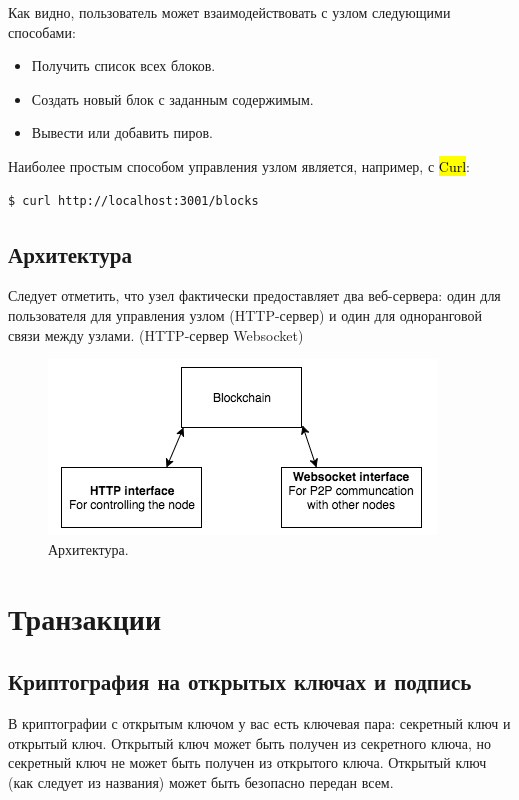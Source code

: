 \documentclass{article}
\begin{document}
Как видно, пользователь может взаимодействовать с узлом следующими способами:

\begin{itemize}
	\item Получить список всех блоков.
	\item Создать новый блок с заданным содержимым.
	\item Вывести или добавить пиров. 
\end{itemize}

Наиболее простым способом управления узлом является, например, с \hl{Curl}:

\begin{lstlisting}[caption={Отправка HTTP запроса, для получения списка блоков.}]
$ curl http://localhost:3001/blocks
\end{lstlisting}


\subsection{Архитектура}

Следует отметить, что узел фактически предоставляет два веб-сервера: один для пользователя для управления узлом (HTTP-сервер) и один для одноранговой связи между узлами. (HTTP-сервер Websocket)

\begin{figure}
	\centering
	\includegraphics[scale=0.5]{architecture}
	\caption{Архитектура.}
	\label{fig:architecture}
\end{figure}

\section{Транзакции}

\subsection{Криптография на открытых ключах и подпись}

В криптографии с открытым ключом у вас есть ключевая пара: секретный ключ и открытый ключ. Открытый ключ может быть получен из секретного ключа, но секретный ключ не может быть получен из открытого ключа. Открытый ключ (как следует из названия) может быть безопасно передан всем.
\end{document}
